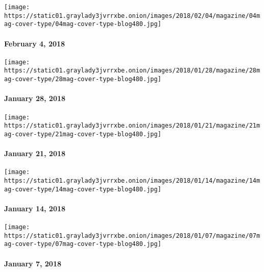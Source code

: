 \texttt{[image: https://static01.graylady3jvrrxbe.onion/images/2018/02/04/magazine/04mag-cover-type/04mag-cover-type-blog480.jpg]}

\hypertarget{february-4-2018}{%
\paragraph{February 4, 2018}\label{february-4-2018}}

\href{https://www.nytimes3xbfgragh.onion/issue/magazine/2018/02/01/12818-issue}{}

\texttt{[image: https://static01.graylady3jvrrxbe.onion/images/2018/01/28/magazine/28mag-cover-type/28mag-cover-type-blog480.jpg]}

\hypertarget{january-28-2018}{%
\paragraph{January 28, 2018}\label{january-28-2018}}

\href{https://www.nytimes3xbfgragh.onion/issue/magazine/2018/01/12/12118-issue}{}

\texttt{[image: https://static01.graylady3jvrrxbe.onion/images/2018/01/21/magazine/21mag-cover-type/21mag-cover-type-blog480.jpg]}

\hypertarget{january-21-2018}{%
\paragraph{January 21, 2018}\label{january-21-2018}}

\href{https://www.nytimes3xbfgragh.onion/issue/magazine/2018/01/19/11418-issue}{}

\texttt{[image: https://static01.graylady3jvrrxbe.onion/images/2018/01/14/magazine/14mag-cover-type/14mag-cover-type-blog480.jpg]}

\hypertarget{january-14-2018}{%
\paragraph{January 14, 2018}\label{january-14-2018}}

\href{https://www.nytimes3xbfgragh.onion/issue/magazine/2018/01/05/10718-issue}{}

\texttt{[image: https://static01.graylady3jvrrxbe.onion/images/2018/01/07/magazine/07mag-cover-type/07mag-cover-type-blog480.jpg]}

\hypertarget{january-7-2018}{%
\paragraph{January 7, 2018}\label{january-7-2018}}

